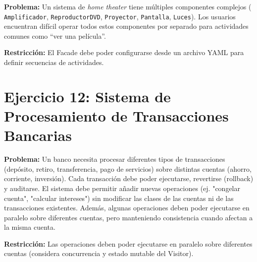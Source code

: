 \documentclass[11pt, a4paper]{article}
\begin{document}
\textbf{Problema:} Un sistema de \textit{home theater} tiene múltiples componentes complejos (
    \texttt{Amplificador}, 
    \texttt{ReproductorDVD},
    \texttt{Proyector},
    \texttt{Pantalla}, 
    \texttt{Luces}). Los usuarios encuentran difícil operar todos estos componentes por separado para actividades comunes como ``ver una película''.

    \vspace{0.3cm}
\textbf{Restricción:} El Facade debe poder configurarse desde un archivo YAML para definir secuencias de actividades.

\fussy






\vspace{0.5cm}
\newpage
{}
{}
\section*{Ejercicio 12: Sistema de Procesamiento de Transacciones Bancarias}

\textbf{Problema:} Un banco necesita procesar diferentes tipos de transacciones (depósito, retiro, transferencia, pago de servicios) sobre distintas cuentas (ahorro, corriente, inversión). Cada transacción debe poder ejecutarse, revertirse (rollback) y auditarse. El sistema debe permitir añadir nuevas operaciones (ej. "congelar cuenta", "calcular intereses") sin modificar las clases de las cuentas ni de las transacciones existentes. Además, algunas operaciones deben poder ejecutarse en paralelo sobre diferentes cuentas, pero manteniendo consistencia cuando afectan a la misma cuenta.

\vspace{0.3cm}

\textbf{Restricción:} Las operaciones deben poder ejecutarse en paralelo sobre diferentes cuentas (considera concurrencia y estado mutable del Visitor).






\end{document}
